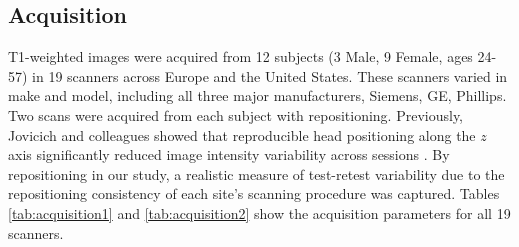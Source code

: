 \subsection{Acquisition}
T1-weighted images were acquired from 12 subjects (3 Male, 9 Female, ages 24-57) in 19 scanners across Europe and the United States. These scanners varied in make and model, including all three major manufacturers, Siemens, GE, Phillips. Two scans were acquired from each subject with repositioning. Previously, Jovicich and colleagues showed that reproducible head positioning along the $z$ axis significantly reduced image intensity variability across sessions \cite{jovicich2006reliability}. By repositioning in our study, a realistic measure of test-retest variability due to the repositioning consistency of each site's scanning procedure was captured. Tables \ref{tab:acquisition1} and \ref{tab:acquisition2} show the acquisition parameters for all 19 scanners.